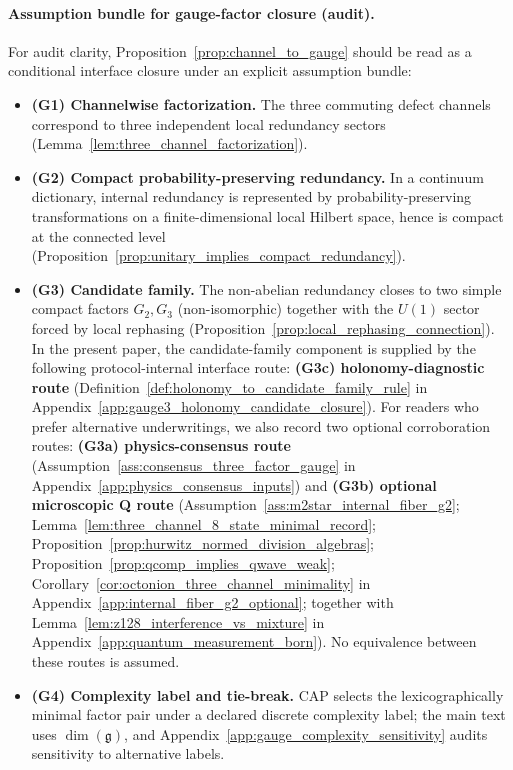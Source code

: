 \paragraph{Assumption bundle for gauge-factor closure (audit).}
\AuditTag For audit clarity, Proposition~\ref{prop:channel_to_gauge} should be read as a conditional interface closure under an explicit assumption bundle:
\begin{itemize}
\item \textbf{(G1) Channelwise factorization.} The three commuting defect channels correspond to three independent local redundancy sectors (Lemma~\ref{lem:three_channel_factorization}).
\item \textbf{(G2) Compact probability-preserving redundancy.} In a continuum dictionary, internal redundancy is represented by probability-preserving transformations on a finite-dimensional local Hilbert space, hence is compact at the connected level (Proposition~\ref{prop:unitary_implies_compact_redundancy}).
\item \textbf{(G3) Candidate family.} The non-abelian redundancy closes to two simple compact factors $G_2,G_3$ (non-isomorphic) together with the $U(1)$ sector forced by local rephasing (Proposition~\ref{prop:local_rephasing_connection}).
In the present paper, the candidate-family component is supplied by the following protocol-internal interface route:
\textbf{(G3c) holonomy-diagnostic route} (Definition~\ref{def:holonomy_to_candidate_family_rule} in Appendix~\ref{app:gauge3_holonomy_candidate_closure}).
For readers who prefer alternative underwritings, we also record two optional corroboration routes:
\textbf{(G3a) physics-consensus route} (Assumption~\ref{ass:consensus_three_factor_gauge} in Appendix~\ref{app:physics_consensus_inputs})
and \textbf{(G3b) optional microscopic Q route} (Assumption~\ref{ass:m2star_internal_fiber_g2}; Lemma~\ref{lem:three_channel_8_state_minimal_record}; Proposition~\ref{prop:hurwitz_normed_division_algebras}; Proposition~\ref{prop:qcomp_implies_qwave_weak}; Corollary~\ref{cor:octonion_three_channel_minimality} in Appendix~\ref{app:internal_fiber_g2_optional}; together with Lemma~\ref{lem:z128_interference_vs_mixture} in Appendix~\ref{app:quantum_measurement_born}).
No equivalence between these routes is assumed.
\item \textbf{(G4) Complexity label and tie-break.} CAP selects the lexicographically minimal factor pair under a declared discrete complexity label; the main text uses $\dim(\mathfrak{g})$, and Appendix~\ref{app:gauge_complexity_sensitivity} audits sensitivity to alternative labels.
\end{itemize}

